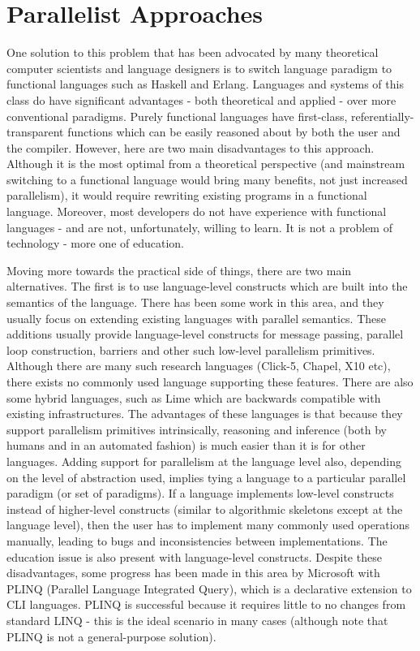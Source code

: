 \section{Parallelist Approaches} \label{sec:introduction/parallelist}
One solution to this problem that has been advocated by many theoretical computer scientists and language designers is to switch language paradigm to functional languages such as Haskell and Erlang. Languages and systems of this class do have significant advantages - both theoretical and applied - over more conventional paradigms. Purely functional languages have first-class, referentially-transparent functions which can be easily reasoned about by both the user and the compiler. However, here are two main disadvantages to this approach. Although it is the most optimal from a theoretical perspective (and mainstream switching to a functional language would bring many benefits, not just increased parallelism), it would require rewriting existing programs in a functional language. Moreover, most developers do not have experience with functional languages - and are not, unfortunately, willing to learn. It is not a problem of technology - more one of education.

Moving more towards the practical side of things, there are two main alternatives. The first is to use language-level constructs which are built into the semantics of the language. There has been some work in this area, and they usually focus on extending existing languages with parallel semantics. These additions usually provide language-level constructs for message passing, parallel loop construction, barriers and other such low-level parallelism primitives. Although there are many such research languages (Click-5, Chapel, X10 etc), there exists no commonly used language supporting these features. There are also some hybrid languages, such as Lime which are backwards compatible with existing infrastructures. The advantages of these languages is that because they support parallelism primitives intrinsically, reasoning and inference (both by humans and in an automated fashion) is much easier than it is for other languages. Adding support for parallelism at the language level also, depending on the level of abstraction used, implies tying a language to a particular parallel paradigm (or set of paradigms). If a language implements low-level constructs instead of higher-level constructs (similar to algorithmic skeletons except at the language level), then the user has to implement many commonly used operations manually, leading to bugs and inconsistencies between implementations. The education issue is also present with language-level constructs. Despite these disadvantages, some progress has been made in this area by Microsoft with PLINQ (Parallel Language Integrated Query), which is a declarative extension to CLI languages. PLINQ is successful because it requires little to no changes from standard LINQ - this is the ideal scenario in many cases (although note that PLINQ is not a general-purpose solution).

